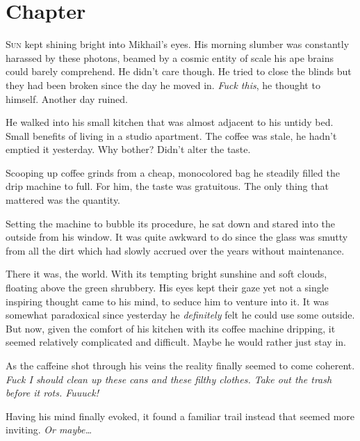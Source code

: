 
\cleardoublepage %

\chapter{Chapter \thechapter}

\lettrine[lraise=0.1, nindent=0.1em, slope=-.5em]{S}{un} kept shining bright into Mikhail’s eyes. His morning slumber was constantly harassed by these photons, beamed by a cosmic entity of scale his ape brains could barely comprehend. He didn’t care though. He tried to close the blinds but they had been broken since the day he moved in. \textit{Fuck this}, he thought to himself. Another day ruined.

He walked into his small kitchen that was almost adjacent to his untidy bed. Small benefits of living in a studio apartment. The coffee was stale, he hadn’t emptied it yesterday. Why bother? Didn’t alter the taste.

Scooping up coffee grinds from a cheap, monocolored bag he steadily filled the drip machine to full. For him, the taste was gratuitous. The only thing that mattered was the quantity.

Setting the machine to bubble its procedure, he sat down and stared into the outside from his window. It was quite awkward to do since the glass was smutty from all the dirt which had slowly accrued over the years without maintenance.

There it was, the world. With its tempting bright sunshine and soft clouds, floating above the green shrubbery. His eyes kept their gaze yet not a single inspiring thought came to his mind, to seduce him to venture into it. It was somewhat paradoxical since yesterday he \textit{definitely} felt he could use some outside. But now, given the comfort of his kitchen with its coffee machine dripping, it seemed relatively complicated and difficult. Maybe he would rather just stay in.

As the caffeine shot through his veins the reality finally seemed to come coherent. \textit{Fuck I should clean up these cans and these filthy clothes. Take out the trash before it rots. Fuuuck!}

Having his mind finally evoked, it found a familiar trail instead that seemed more inviting. \textit{Or maybe…}

